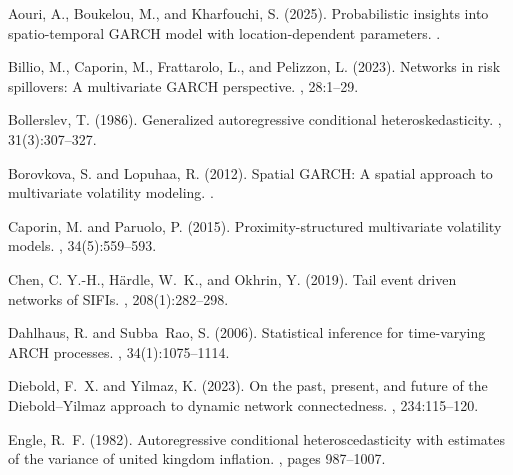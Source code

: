 \documentclass[fleqn,11pt]{article}
\begin{document}
 
% 

\begin{thebibliography}{}
	
	Aouri, A., Boukelou, M., and Kharfouchi, S. (2025).
	\newblock Probabilistic insights into spatio-temporal {GARCH} model with
	location-dependent parameters.
	.
	
	Billio, M., Caporin, M., Frattarolo, L., and Pelizzon, L. (2023).
	\newblock Networks in risk spillovers: A multivariate {GARCH} perspective.
	, 28:1--29.
	
	Bollerslev, T. (1986).
	\newblock Generalized autoregressive conditional heteroskedasticity.
	, 31(3):307--327.
	
	Borovkova, S. and Lopuhaa, R. (2012).
	\newblock Spatial {GARCH}: A spatial approach to multivariate volatility
	modeling.
	.
	
	Caporin, M. and Paruolo, P. (2015).
	\newblock Proximity-structured multivariate volatility models.
	, 34(5):559--593.
	
	Chen, C. Y.-H., H{\"a}rdle, W.~K., and Okhrin, Y. (2019).
	\newblock Tail event driven networks of {SIFIs}.
	, 208(1):282--298.
	
	Dahlhaus, R. and Subba~Rao, S. (2006).
	\newblock Statistical inference for time-varying {ARCH} processes.
	, 34(1):1075--1114.
	
	Diebold, F.~X. and Yilmaz, K. (2023).
	\newblock On the past, present, and future of the {Diebold--Yilmaz} approach to
	dynamic network connectedness.
	, 234:115--120.
	
	Engle, R.~F. (1982).
	\newblock Autoregressive conditional heteroscedasticity with estimates of the
	variance of united kingdom inflation.
	, pages
	987--1007.
	

\end{thebibliography}
\end{document}
